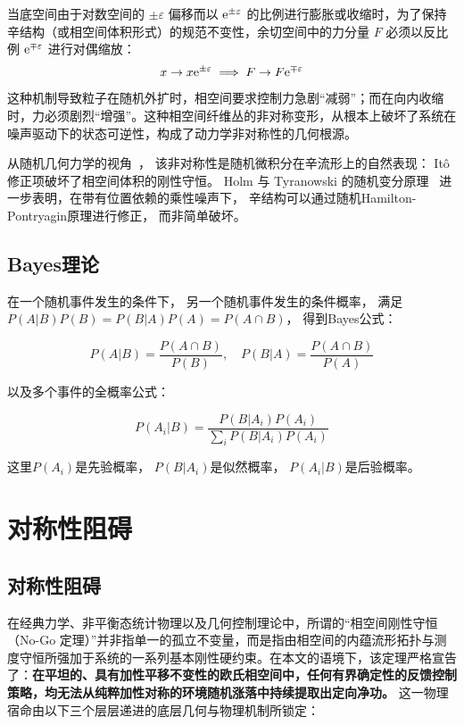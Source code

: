 ﻿\documentclass[10pt,a4paper]{article}
\numberwithin{equation}{section}
\begin{document}
当底空间由于对数空间的 $\pm\varepsilon$ 偏移而以 $\text e^{\pm\varepsilon}$ 的比例进行膨胀或收缩时，为了保持辛结构（或相空间体积形式）的规范不变性，余切空间中的力分量 $F$ 必须以反比例 $\text e^{\mp\varepsilon}$ 进行对偶缩放：
\begin{equation}
x \to x \text e^{\pm\varepsilon} \implies F \to F \text e^{\mp\varepsilon}
\end{equation}
这种机制导致粒子在随机外扩时，相空间要求控制力急剧“减弱”；而在向内收缩时，力必须剧烈“增强”。这种相空间纤维丛的非对称变形，从根本上破坏了系统在噪声驱动下的状态可逆性，构成了动力学非对称性的几何根源。

从随机几何力学的视角~\cite{Bismut1981}，
该非对称性是随机微积分在辛流形上的自然表现：
It\^{o} 修正项破坏了相空间体积的刚性守恒。
Holm 与 Tyranowski 的随机变分原理~\cite{HolmTyranowski2016}
进一步表明，在带有位置依赖的乘性噪声下，
辛结构可以通过随机Hamilton-Pontryagin原理进行修正，
而非简单破坏。

\subsection{Bayes理论}

在一个随机事件发生的条件下，
另一个随机事件发生的条件概率，
满足$P(A|B)P(B) = P(B|A)P(A) = P(A \cap B)$，
得到Bayes公式：

\begin{equation}
P(A|B) = \frac{P(A \cap B)}{P(B)},\quad 
P(B|A) = \frac{P(A \cap B)}{P(A)}
\label{eq:Bayesian}
\end{equation}

以及多个事件的全概率公式：

$$
P(A_i|B) = \frac{P(B|A_i)P(A_i)}{\sum_i P(B|A_i)P(A_i)}
$$

这里$P(A_i)$是先验概率，
$P(B|A_i)$是似然概率，
$P(A_i|B)$是后验概率。

\section{对称性阻碍}

\subsection{对称性阻碍}
\label{subsec:no_go_theorem}

在经典力学、非平衡态统计物理以及几何控制理论中，所谓的“相空间刚性守恒（No-Go 定理）”并非指单一的孤立不变量，而是指由相空间的内蕴流形拓扑与测度守恒所强加于系统的一系列基本刚性硬约束。在本文的语境下，该定理严格宣告了：\textbf{在平坦的、具有加性平移不变性的欧氏相空间中，任何有界确定性的反馈控制策略，均无法从纯粹加性对称的环境随机涨落中持续提取出定向净功。} 这一物理宿命由以下三个层层递进的底层几何与物理机制所锁定：
\end{document}

